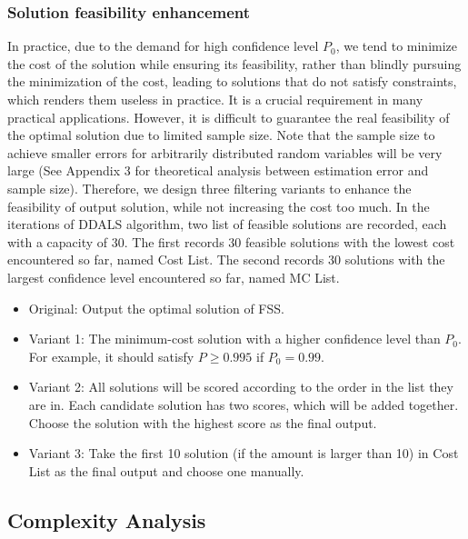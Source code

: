 \documentclass[lettersize,journal]{IEEEtran}
\begin{document}
\subsubsection{Solution feasibility enhancement}
In practice, due to the demand for high confidence level $P_0$, we tend to minimize the cost of the solution while ensuring its feasibility, rather than blindly pursuing the minimization of the cost, leading to solutions that do not satisfy constraints, which renders them useless in practice. 
It is a crucial requirement in many practical applications.
However, it is difficult to guarantee the real feasibility of the optimal solution due to limited sample size. 
Note that the sample size to achieve smaller errors for arbitrarily distributed random variables will be very large (See Appendix 3 for theoretical analysis between estimation error and sample size). 
Therefore, we design three filtering variants to enhance the feasibility of output solution, while not increasing the cost too much. 
In the iterations of DDALS algorithm, two list of feasible solutions are recorded, each with a capacity of 30. 
The first records 30 feasible solutions with the lowest cost encountered so far, named Cost List.
The second records 30 solutions with the largest confidence level encountered so far, named MC List.

\begin{itemize}
    \item Original: Output the optimal solution of FSS. 
    \item Variant 1: The minimum-cost solution with a higher confidence level than $P_0$. For example, it should satisfy $P \geq 0.995$ if $P_0 = 0.99$. 
    \item Variant 2: All solutions will be scored according to the order in the list they are in. 
    Each candidate solution has two scores, which will be added together. 
    Choose the solution with the highest score as the final output.
    \item Variant 3: Take the first 10 solution (if the amount is larger than 10) in Cost List as the final output and choose one manually.
\end{itemize}

\subsection{Complexity Analysis}
\end{document}
